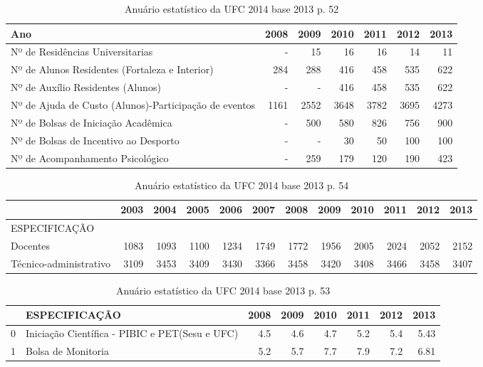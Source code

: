 \documentclass{report}
\begin{document}
\begin{table}
\begin{tabular}{lrrrrrr}
\toprule
Ano &  2008 &  2009 &  2010 &  2011 &  2012 &  2013 \\
\midrule
Nº de Residências Universitarias                      & - &  15 &  16 &  16 &  14 &  11 \\
Nº de Alunos Residentes (Fortaleza e Interior)        &  284 &  288 &  416 &  458 &  535 &  622 \\
Nº de Auxílio Residentes (Alunos)                     & - & - &  416 &  458 &  535 &  622 \\
Nº de Ajuda de Custo (Alunos)-Participação de eventos &  1161 &  2552 &  3648 &  3782 &  3695 &  4273 \\
Nº de Bolsas de Iniciação Acadêmica                   & - &  500 &  580 &  826 &  756 &  900 \\
Nº de Bolsas de Incentivo ao Desporto                 & - & - &  30 &  50 &  100 &  100 \\
Nº de Acompanhamento Psicológico                      & - &  259 &  179 &  120 &  190 &  423 \\
\bottomrule
\end{tabular}
\caption{Anuário estatístico da UFC 2014 base 2013 p. 52}
\label{table:assistencia-ufc}
\end{table}

\begin{table}
\begin{tabular}{lrrrrrrrrrrr}
\toprule
{} &  2003 &  2004 &  2005 &  2006 &  2007 &  2008 &  2009 &  2010 &  2011 &  2012 &  2013 \\
\midrule
ESPECIFICAÇÃO          &       &       &       &       &       &       &       &       &       &       &       \\
Docentes               &  1083 &  1093 &  1100 &  1234 &  1749 &  1772 &  1956 &  2005 &  2024 &  2052 &  2152 \\
Técnico-administrativo &  3109 &  3453 &  3409 &  3430 &  3366 &  3458 &  3420 &  3408 &  3466 &  3458 &  3407 \\
\bottomrule
\end{tabular}
\caption{Anuário estatístico da UFC 2014 base 2013 p. 54}
\label{table:servidores-ufc}
\end{table}

\begin{table}
\begin{tabular}{llrrrrrr}
\toprule
{} &                                   ESPECIFICAÇÃO &  2008 &  2009 &  2010 &  2011 &  2012 &  2013 \\
\midrule
0 &  Iniciação Científica - PIBIC e PET(Sesu e UFC) &   4.5 &   4.6 &   4.7 &   5.2 &   5.4 &  5.43 \\
1 &                              Bolsa de Monitoria &   5.2 &   5.7 &   7.7 &   7.9 &   7.2 &  6.81 \\
\bottomrule
\end{tabular}
\caption{Anuário estatístico da UFC 2014 base 2013 p. 53}
\label{table:pct_discentes_bolsas-ufc}
\end{table}



\end{document}
